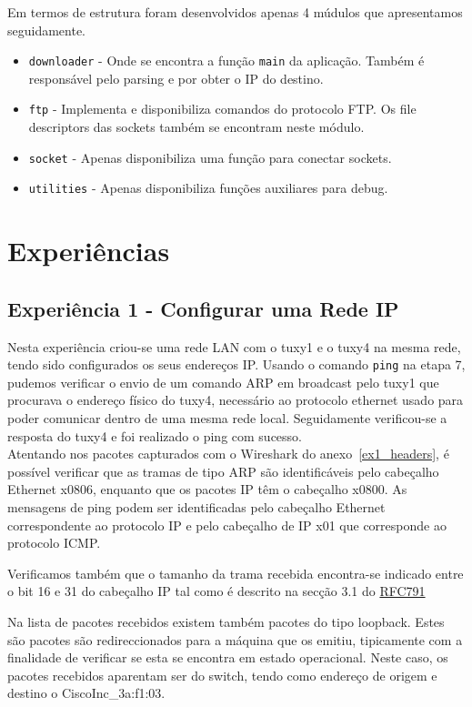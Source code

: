 \documentclass[11pt,a4paper,reqno]{report}
\numberwithin{equation}{section}
\begin{document}
Em termos de estrutura foram desenvolvidos apenas 4 múdulos que apresentamos seguidamente.
\begin{itemize} 
\item \verb|downloader| - Onde se encontra a função \verb|main| da aplicação. Também é responsável pelo parsing e por obter o IP do destino.
\item \verb|ftp| -  Implementa e disponibiliza comandos do protocolo FTP. Os file descriptors das sockets também se encontram neste módulo.
\item \verb|socket| - Apenas disponibiliza uma função para conectar sockets.
\item \verb|utilities| - Apenas disponibiliza funções auxiliares para debug.
\end{itemize}

\pagebreak
\chapter{Experiências}

\section{Experiência 1 - Configurar uma Rede IP}

Nesta experiência criou-se uma rede LAN com o tuxy1 e o tuxy4 na mesma rede, tendo sido configurados os seus endereços IP. Usando o comando \verb|ping| na etapa 7, pudemos verificar o envio de um comando ARP em broadcast pelo tuxy1 que procurava o endereço físico do tuxy4, necessário ao protocolo ethernet usado para poder comunicar dentro de uma mesma rede local. Seguidamente verificou-se a resposta do tuxy4 e foi realizado o ping com sucesso.\\

Atentando nos pacotes capturados com o Wireshark do anexo~\ref{ex1_headers}, é possível verificar que as tramas de tipo ARP são identificáveis pelo cabeçalho Ethernet x0806, enquanto que os pacotes IP têm o cabeçalho x0800. As mensagens de ping podem ser identificadas pelo cabeçalho Ethernet correspondente ao protocolo IP e pelo cabeçalho de IP x01 que corresponde ao protocolo ICMP.

Verificamos também que o tamanho da trama recebida encontra-se indicado entre o bit 16 e 31 do cabeçalho IP tal como é descrito na secção 3.1 do \href{https://www.ietf.org/rfc/rfc791.txt}{RFC791}

Na lista de pacotes recebidos existem também pacotes do tipo loopback. Estes são pacotes são redireccionados para a máquina que os emitiu, tipicamente com a finalidade de verificar se esta se encontra em estado operacional. Neste caso, os pacotes recebidos aparentam ser do switch, tendo como endereço de origem e destino o CiscoInc\_3a:f1:03.
\end{document}
